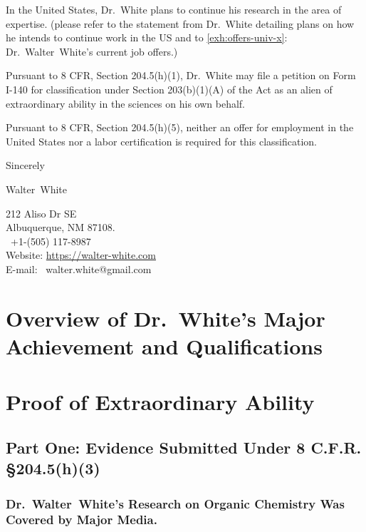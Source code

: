 \documentclass{article}
\renewcommand{\contentsname}{\hfill\bfseries\Large Table of Contents \hfill}
\newcommand{\fname}{Walter}
\newcommand{\lname}{White}
\newcommand{\fullname}{\fname~\lname}
\newcommand{\dr}{Dr.~\fname~\lname}
\newcommand{\drfn}{Dr.~\lname}
\newcommand{\myaddr}{212 Aliso Dr SE \\ Albuquerque, NM 87108. \\ \faMobilePhone \ +1-(505) 117-8987}
\newcommand{\oc}{Organic Chemistry}
\begin{document}
In the United States, \drfn{} plans to continue his research in the area of expertise.
(please refer to the statement from \drfn{} detailing plans on how he intends to continue work in the US
and to \ref{exh:offers-univ-x}: \dr's current job offers.)

Pursuant to 8 CFR, Section 204.5(h)(1), \drfn{} may file a petition on Form I-140 for
classification under Section 203(b)(1)(A) of the Act as an alien of extraordinary ability in the sciences on his own behalf.

Pursuant to 8 CFR, Section 204.5(h)(5), neither an offer for employment in the United States nor a labor certification is required for this classification.


Sincerely \\

\vspace{2em}

\fullname

\vspace{-1em}

\myaddr \\
Website: \url{https://walter-white.com}   \\
E-mail: \ walter.white@gmail.com
\pagebreak

% 
% 
% 

\pagebreak
\renewcommand{\baselinestretch}{0.8}\normalsize
\tableofcontents
\renewcommand{\baselinestretch}{1.0}\normalsize
\pagebreak


\section { Overview of \drfn{}’s Major Achievement and Qualifications}
\lipsum[1-1]


\pagebreak
\section{Proof of Extraordinary Ability}
\subsection{Part One: Evidence Submitted Under 8 C.F.R. \S 204.5(h)(3)}
\subsubsection{
    \dr's Research on \oc{} Was Covered by Major Media.
}\label{sec:mit-technology-review}
\end{document}
